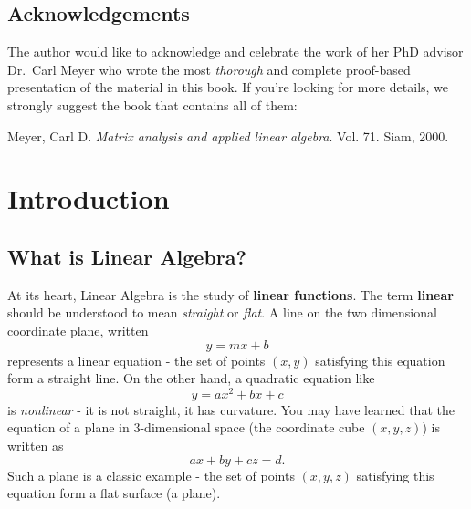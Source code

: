 \documentclass[
]{article}
\theoremstyle{definition}
\theoremstyle{definition}
\theoremstyle{definition}
\theoremstyle{definition}
\theoremstyle{remark}
\begin{document}
\hypertarget{acknowledgements}{%
\subsection*{Acknowledgements}\label{acknowledgements}}

The author would like to acknowledge and celebrate the work of her PhD advisor Dr.~Carl Meyer who wrote the most \emph{thorough} and complete proof-based presentation of the material in this book. If you're looking for more details, we strongly suggest the book that contains all of them:

Meyer, Carl D. \emph{Matrix analysis and applied linear algebra}. Vol. 71. Siam, 2000.

\hypertarget{intro}{%
\section{Introduction}\label{intro}}

\hypertarget{what-is-linear-algebra}{%
\subsection{What is Linear Algebra?}\label{what-is-linear-algebra}}

At its heart, Linear Algebra is the study of \textbf{linear functions}. The term \textbf{linear} should be understood to mean \emph{straight} or \emph{flat}. A line on the two dimensional coordinate plane, written \[y=mx+b\] represents a linear equation - the set of points \((x,y)\) satisfying this equation form a straight line. On the other hand, a quadratic equation like \[y=ax^2+bx+c\] is \emph{nonlinear} - it is not straight, it has curvature. You may have learned that the equation of a plane in 3-dimensional space (the coordinate cube \((x,y,z)\)) is written as
\[ax+by+cz=d.\]
Such a plane is a classic example - the set of points \((x,y,z)\) satisfying this equation form a flat surface (a plane).
\end{document}
